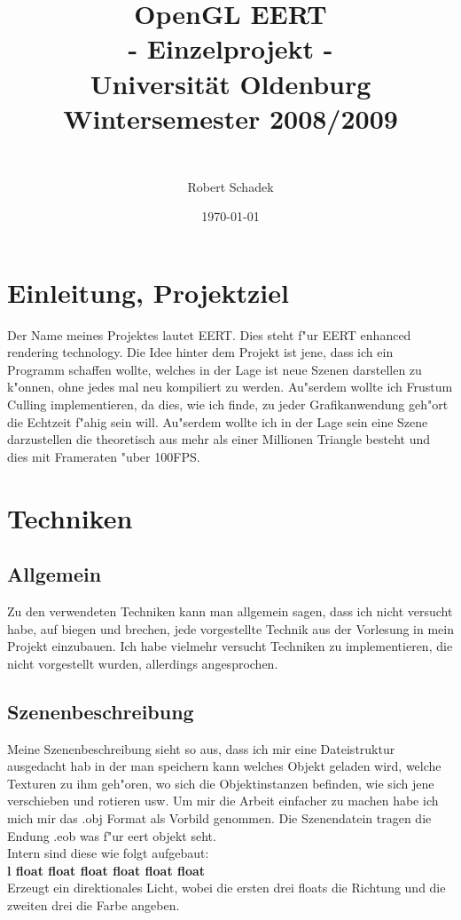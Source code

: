\documentclass[a4paper,titlepage]{article}
\title{
	{\huge OpenGL EERT\\
	\huge - Einzelprojekt -\\
	{\large Universit\"at Oldenburg}\\
	\large Wintersemester 2008/2009\\
	}
	\date{\today}
	\author{\\
		\large 	Robert Schadek\\
	}
}
\begin{document}
\maketitle
\tableofcontents
\section{Einleitung, Projektziel}
Der Name meines Projektes lautet EERT. Dies steht f"ur EERT enhanced rendering technology.
Die Idee hinter dem Projekt ist jene, dass ich ein Programm schaffen wollte, welches in der Lage ist
neue Szenen darstellen zu k"onnen, ohne jedes mal neu kompiliert zu werden. Au"serdem wollte ich Frustum 
Culling implementieren, da dies, wie ich finde, zu jeder Grafikanwendung geh"ort die Echtzeit f"ahig 
sein will. Au"serdem wollte ich in der Lage sein eine Szene darzustellen die theoretisch aus mehr als einer
Millionen Triangle besteht und dies mit Frameraten "uber 100FPS.\\

\section{Techniken}
\subsection{Allgemein}
Zu den verwendeten Techniken kann man allgemein sagen, dass ich nicht versucht habe, auf biegen und brechen, 
jede vorgestellte Technik aus der Vorlesung in mein Projekt einzubauen. Ich habe vielmehr versucht Techniken 
zu implementieren, die nicht vorgestellt wurden, allerdings angesprochen.

\subsection{Szenenbeschreibung}
Meine Szenenbeschreibung sieht so aus, dass ich mir eine Dateistruktur ausgedacht hab in der man speichern 
kann welches Objekt geladen wird, welche Texturen zu ihm geh"oren, wo sich die Objektinstanzen befinden, wie 
sich jene verschieben und rotieren usw. Um mir die Arbeit einfacher zu machen habe ich mich mir das .obj Format 
als Vorbild genommen. Die Szenendatein tragen die Endung .eob was f"ur eert objekt seht.\\
Intern sind diese wie folgt aufgebaut:\\

\textbf{l float float float float float float}\\
Erzeugt ein direktionales Licht, wobei die ersten drei floats die Richtung und die zweiten drei die Farbe angeben.\\
\end{document}
